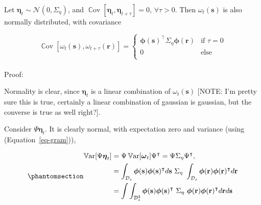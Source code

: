 \documentclass[
  letterpaper,
  DIV=11,
  numbers=noendperiod]{scrartcl}
\makeatletter
\let\oldparagraph\paragraph
\renewcommand{\paragraph}{
    \@ifstar
      \xxxParagraphStar
      \xxxParagraphNoStar
  }
\newcommand{\xxxParagraphStar}[1]{\oldparagraph*{#1}\mbox{}}
\newcommand{\xxxParagraphNoStar}[1]{\oldparagraph{#1}\mbox{}}
\makeatother
\begin{document}
Let \(\boldsymbol{\mathbf{\eta}}_t \sim \mathcal N(0, \Sigma_\eta)\),
and
\(\mathop{\mathrm{\mathbb{C}\mathrm{ov}}}[\boldsymbol{\mathbf{\eta}}_t, \boldsymbol{\mathbf{\eta}}_{t+\tau}] =0\),
\(\forall \tau>0\). Then \(\omega_t(\boldsymbol{\mathbf{s}})\) is also
normally distributed, with covariance

\[
\mathop{\mathrm{\mathbb{C}\mathrm{ov}}}[\omega_t(\boldsymbol{\mathbf{s}}), \omega_{t+\tau}(\boldsymbol{\mathbf{r}})] = \begin{cases}
\boldsymbol{\mathbf{\phi}}(\boldsymbol{\mathbf{s}})^\intercal \Sigma_\eta \boldsymbol{\mathbf{\phi}}(\boldsymbol{\mathbf{r}}) & \text{if }\tau=0\\
0 & \text{else}\\
\end{cases}
\]

\paragraph{Proof:}\label{proof-1}

Normality is clear, since \(\boldsymbol{\mathbf{\eta}}_t\) is a linear
combination of \(\omega_t(\boldsymbol{\mathbf{s}})\) {{[}NOTE: I'm
pretty sure this is true, certainly a linear combination of gaussian is
gaussian, but the converse is true as well right?{]}}.

Consider \(\Psi \boldsymbol{\mathbf{\eta}}_t\). It is clearly normal,
with expectation zero and variance (using (Equation~\ref{eq-gram})),

\begin{equation}\phantomsection\label{eq-var1}{
\begin{split}
\mathop{\mathrm{\mathbb{V}\mathrm{ar}}}[\Psi \boldsymbol{\mathbf{\eta}}_t] &= \Psi \mathop{\mathrm{\mathbb{V}\mathrm{ar}}}[\boldsymbol{\mathbf{\omega}}_t] \Psi^\intercal = \Psi\Sigma_\eta\Psi^\intercal,\\
&= \int_{\mathcal D_s} \boldsymbol{\mathbf{\phi}}(\boldsymbol{\mathbf{s}}) \boldsymbol{\mathbf{\phi}}(\boldsymbol{\mathbf{s}})^\intercal d\boldsymbol{\mathbf{s}} \  \Sigma_\eta \ \int_{\mathcal D_s} \boldsymbol{\mathbf{\phi}}(\boldsymbol{\mathbf{r}}) \boldsymbol{\mathbf{\phi}}(\boldsymbol{\mathbf{r}})^\intercal d\boldsymbol{\mathbf{r}}\\
&=  \int\int_{\mathcal D_s^2} \boldsymbol{\mathbf{\phi}}(\boldsymbol{\mathbf{s}}) \boldsymbol{\mathbf{\phi}}(\boldsymbol{\mathbf{s}})^\intercal \  \Sigma_\eta \  \boldsymbol{\mathbf{\phi}}(\boldsymbol{\mathbf{r}}) \boldsymbol{\mathbf{\phi}}(\boldsymbol{\mathbf{r}})^\intercal d\boldsymbol{\mathbf{r}} d\boldsymbol{\mathbf{s}}\\
\end{split}
}\end{equation}
\end{document}

